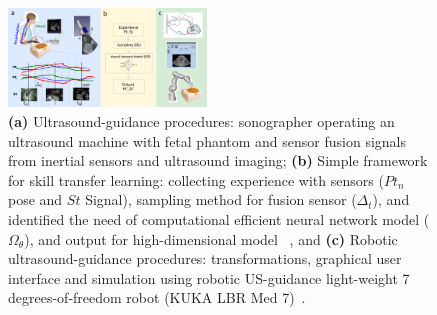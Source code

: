 \documentclass[a4paper, 10pt, conference]{ieeeconf}      %
\begin{document}
\begin{figure}[t]
\centering
\includegraphics[width=0.47\textwidth]{fig-framework.png} %
    \caption{
            \textbf{(a)} Ultrasound-guidance procedures:
		sonographer operating an ultrasound machine with fetal phantom and sensor fusion signals from inertial sensors and ultrasound imaging;
            \textbf{(b)} Simple framework for skill transfer learning: 
		collecting experience with sensors ($Pt_n$ pose and $St$ Signal), sampling method for fusion sensor ($\Delta_t$), and identified the need of computational efficient neural network model ($\Omega_\theta$), and output for high-dimensional model ~\cite{deng2021}, and 
            \textbf{(c)} Robotic ultrasound-guidance procedures:
		transformations, graphical user interface and simulation using robotic US-guidance light-weight 7 degrees-of-freedom robot (KUKA LBR Med 7)~\cite{Gerlach2022, Ipsen2021}.
       }
\label{fig:main}
\end{figure}

\end{document}

